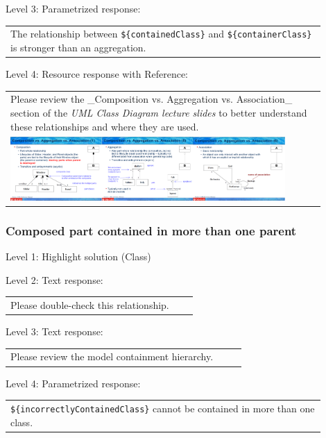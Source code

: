 \noindent Level 3: Parametrized response: \medskip

\begin{tabular}{|p{0.9\linewidth}}
The relationship between \verb|${containedClass}| and \verb|${containerClass}| is stronger than an aggregation.
\end{tabular} \medskip

\noindent Level 4: Resource response with Reference: \medskip

\begin{tabular}{|p{0.9\linewidth}}
Please review the _Composition vs. Aggregation vs. Association_ section of 
the \textit{UML Class Diagram lecture slides} to 
better understand these relationships and where they are used.

\\
\includegraphics[width=0.9\textwidth]{images/composition_aggregation_association.png}
\end{tabular} \medskip


\subsubsection{Composed part contained in more than one parent}

\noindent Level 1: Highlight solution (Class) \medskip

\noindent Level 2: Text response: \medskip

\begin{tabular}{|p{0.9\linewidth}}
Please double-check this relationship.
\end{tabular} \medskip

\noindent Level 3: Text response: \medskip

\begin{tabular}{|p{0.9\linewidth}}
Please review the model containment hierarchy.
\end{tabular} \medskip

\noindent Level 4: Parametrized response: \medskip

\begin{tabular}{|p{0.9\linewidth}}
\verb|${incorrectlyContainedClass}| cannot be contained in more than one class.
\end{tabular} \medskip

